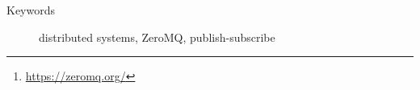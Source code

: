 \begin{abstract}

This report will describe the implementation details of the project developed in the scope of the Large Scale Distributed Systems course of M.EIC, FEUP. The project focuses on building a reliant publish-subscribe service that ensures exactly once delivery of messages/posts using the \emph{ZeroMQ}\footnote{\url{https://zeromq.org/}} library. 

\end{abstract}

\begin{description}
    \item[Keywords] distributed systems, ZeroMQ, publish-subscribe
\end{description}



